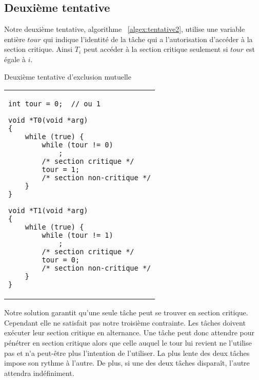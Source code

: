 \subsection*{Deuxième tentative}
Notre deuxième tentative, algorithme ~\ref{algex:tentative2}, utilise une variable entière $tour$ qui indique l'identité de la tâche qui a l'autorisation d'accéder à la section critique.
Ainsi $T_i$ peut accéder à la section critique seulement si $tour$ est égale à $i$.

\begin{algorithm}[!ht]
\caption{Deuxième tentative d'exclusion mutuelle}\label{algex:tentative2}
\begin{center}
\begin{tabular}{l}
\lstset{language=C++}
\begin{lstlisting}
int tour = 0;  // ou 1

void *T0(void *arg)
{
	while (true) {
		while (tour != 0)
			;
		/* section critique */
		tour = 1;
		/* section non-critique */
	}
}

void *T1(void *arg)
{
	while (true) {
		while (tour != 1)
			;
		/* section critique */
		tour = 0;
		/* section non-critique */
	}
}
\end{lstlisting}
\end{tabular}
\end{center}
\end{algorithm}

Notre solution garantit qu'une seule tâche peut se trouver en section critique.  Cependant elle ne satisfait pas notre troisième contrainte.
Les tâches doivent exécuter leur section critique en alternance.
Une tâche peut donc attendre pour pénétrer en section critique alors que celle auquel le tour lui revient ne l'utilise pas et n'a peut-être plus l'intention de l'utiliser.
La plus lente des deux tâches impose son rythme à l'autre.  De plus, si une des deux tâches disparaît, l'autre attendra indéfiniment.

